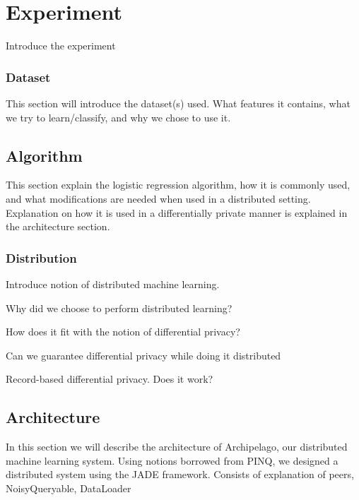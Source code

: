 
\chapter{Experiment}

Introduce the experiment

\subsection{Dataset}
This section will introduce the dataset(s) used. What features it contains, what we try to learn/classify, and why we chose to use it.

\section{Algorithm}
This section explain the logistic regression algorithm, how it is commonly used, and what modifications are needed when used in a distributed setting. Explanation on how it is used in a differentially private manner is explained in the architecture section. 


\subsection{Distribution}
Introduce notion of distributed machine learning. 

Why did we choose to perform distributed learning?

How does it fit with the notion of differential privacy?

Can we guarantee differential privacy while doing it distributed

Record-based differential privacy. Does it work?


\section{Architecture}

In this section we will describe the architecture of Archipelago, our distributed machine learning system. 
Using notions borrowed from PINQ, we designed a distributed system using the JADE framework. Consists of explanation of peers, NoisyQueryable, DataLoader


